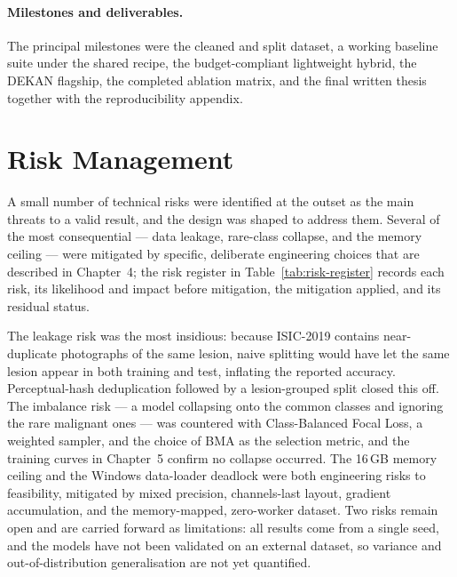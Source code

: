 \paragraph{Milestones and deliverables.}
The principal milestones were the cleaned and split dataset, a working
baseline suite under the shared recipe, the budget-compliant lightweight
hybrid, the DEKAN flagship, the completed ablation matrix, and the final
written thesis together with the reproducibility appendix.


\section{Risk Management}
\label{sec:risk-management}

A small number of technical risks were identified at the outset as the main
threats to a valid result, and the design was shaped to address them. Several
of the most consequential --- data leakage, rare-class collapse, and the
memory ceiling --- were mitigated by specific, deliberate engineering choices
that are described in Chapter~4; the risk register in
Table~\ref{tab:risk-register} records each risk, its likelihood and impact
before mitigation, the mitigation applied, and its residual status.

The leakage risk was the most insidious: because ISIC-2019 contains
near-duplicate photographs of the same lesion, naive splitting would have let
the same lesion appear in both training and test, inflating the reported
accuracy. Perceptual-hash deduplication followed by a lesion-grouped split
closed this off. The imbalance risk --- a model collapsing onto the common
classes and ignoring the rare malignant ones --- was countered with
Class-Balanced Focal Loss, a weighted sampler, and the choice of BMA as the
selection metric, and the training curves in Chapter~5 confirm no collapse
occurred. The 16\,GB memory ceiling and the Windows data-loader deadlock were
both engineering risks to feasibility, mitigated by mixed precision,
channels-last layout, gradient accumulation, and the memory-mapped,
zero-worker dataset. Two risks remain open and are carried forward as
limitations: all results come from a single seed, and the models have not been
validated on an external dataset, so variance and out-of-distribution
generalisation are not yet quantified.

